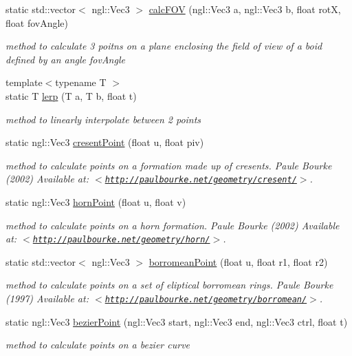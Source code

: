 \begin{DoxyCompactItemize}
static std::vector$<$ ngl::Vec3 $>$ \hyperlink{classBoidMath_ab1a1787cf7762f8193ef70b2b83a7416}{calcFOV} (ngl::Vec3 a, ngl::Vec3 b, float rotX, float fovAngle)
\begin{DoxyCompactList}\small\item\em method to calculate 3 poitns on a plane enclosing the field of view of a boid defined by an angle fovAngle \item\end{DoxyCompactList}\item 
{\footnotesize template$<$typename T $>$ }\\static T \hyperlink{classBoidMath_aca4c74ae6d21b75541ccaf8007af4d2d}{lerp} (T a, T b, float t)
\begin{DoxyCompactList}\small\item\em method to linearly interpolate between 2 points \item\end{DoxyCompactList}\item 
static ngl::Vec3 \hyperlink{classBoidMath_aaf61747aac10ac35975469f9e1b67e66}{cresentPoint} (float u, float piv)
\begin{DoxyCompactList}\small\item\em method to calculate points on a formation made up of cresents. Paule Bourke (2002) Available at: $<$\href{http://paulbourke.net/geometry/cresent/}{\tt http://paulbourke.net/geometry/cresent/}$>$. \item\end{DoxyCompactList}\item 
static ngl::Vec3 \hyperlink{classBoidMath_aeaef9db8eb5da71f8f10c4892ff044ae}{hornPoint} (float u, float v)
\begin{DoxyCompactList}\small\item\em method to calculate points on a horn formation. Paule Bourke (2002) Available at: $<$\href{http://paulbourke.net/geometry/horn/}{\tt http://paulbourke.net/geometry/horn/}$>$. \item\end{DoxyCompactList}\item 
static std::vector$<$ ngl::Vec3 $>$ \hyperlink{classBoidMath_a933eefc38fd6e377f5de824f4af92f14}{borromeanPoint} (float u, float r1, float r2)
\begin{DoxyCompactList}\small\item\em method to calculate points on a set of eliptical borromean rings. Paule Bourke (1997) Available at: $<$\href{http://paulbourke.net/geometry/borromean/}{\tt http://paulbourke.net/geometry/borromean/}$>$. \item\end{DoxyCompactList}\item 
static ngl::Vec3 \hyperlink{classBoidMath_a5d79930301768c78ba68963bd13e263d}{bezierPoint} (ngl::Vec3 start, ngl::Vec3 end, ngl::Vec3 ctrl, float t)
\begin{DoxyCompactList}\small\item\em method to calculate points on a bezier curve \item\end{DoxyCompactList}\end{DoxyCompactItemize}


